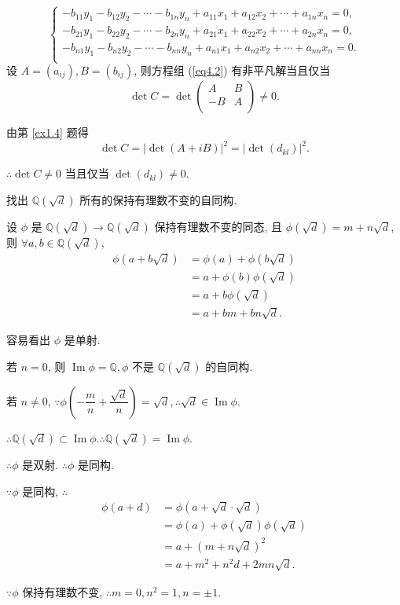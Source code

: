 \documentclass[UTF8]{ctexart}
\begin{document}
\begin{solution}
\begin{equation}
\begin{cases}
            -b_{11}y_1-b_{12}y_2-\cdots-b_{1n}y_n+a_{11}x_1+a_{12}x_2+\cdots+a_{1n}x_n=0, \\
            -b_{21}y_1-b_{22}y_2-\cdots-b_{2n}y_n+a_{21}x_1+a_{22}x_2+\cdots+a_{2n}x_n=0, \\
            -b_{n1}y_1-b_{n2}y_2-\cdots-b_{nn}y_n+a_{n1}x_1+a_{n2}x_2+\cdots+a_{nn}x_n=0. \\
        \end{cases}
    \end{equation}
    设 $A=(a_{ij}),B=(b_{ij})$, 则方程组 (\ref{eq4.2}) 有非平凡解当且仅当
    \[\det C=\det\begin{pmatrix}
        A & B \\
        -B & A \\
    \end{pmatrix}\neq0.\]

    由第 \ref{ex1.4} 题得
    \[\det C=|\det(A+iB)|^2=|\det(d_{kl})|^2.\]

    $\therefore\det C\neq0$ 当且仅当 $\det(d_{kl})\neq0$.
\end{solution}
\begin{exercise}[1.6]
    找出 $\mathbb{Q}(\sqrt{d})$ 所有的保持有理数不变的自同构.
\end{exercise}
\begin{solution}
    设 $\phi$ 是 $\mathbb{Q}(\sqrt{d})\to\mathbb{Q}(\sqrt{d})$ 保持有理数不变的同态, 且 $\phi(\sqrt{d})=m+n\sqrt{d}$, 则 $\forall a,b\in\mathbb{Q}(\sqrt{d})$,
    \begin{align*}
        \phi(a+b\sqrt{d}) & =\phi(a)+\phi(b\sqrt{d}) \\
        & =a+\phi(b)\phi(\sqrt{d}) \\
        & =a+b\phi(\sqrt{d}) \\
        & =a+bm+bn\sqrt{d}.
    \end{align*}

    容易看出 $\phi$ 是单射.

    若 $n=0$, 则 $\operatorname{Im}\phi=\mathbb{Q},\phi$ 不是 $\mathbb{Q}(\sqrt{d})$ 的自同构.

    若 $n\neq0$, $\because\phi\left(-\dfrac{m}{n}+\dfrac{\sqrt{d}}{n}\right)=\sqrt{d},\therefore\sqrt{d}\in\operatorname{Im}\phi$.

    $\therefore\mathbb{Q}(\sqrt{d})\subset\operatorname{Im}\phi.\therefore\mathbb{Q}(\sqrt{d})=\operatorname{Im}\phi$.

    $\therefore\phi$ 是双射. $\therefore\phi$ 是同构.

    $\because\phi$ 是同构, $\therefore$
    \begin{align*}
        \phi(a+d) & =\phi(a+\sqrt{d}\cdot\sqrt{d}) \\
        & =\phi(a)+\phi(\sqrt{d})\phi(\sqrt{d}) \\
        & =a+(m+n\sqrt{d})^2 \\
        & =a+m^2+n^2d+2mn\sqrt{d}.
    \end{align*}

    $\because\phi$ 保持有理数不变, $\therefore m=0,n^2=1,n=\pm1$.
\end{solution}
\end{document}
